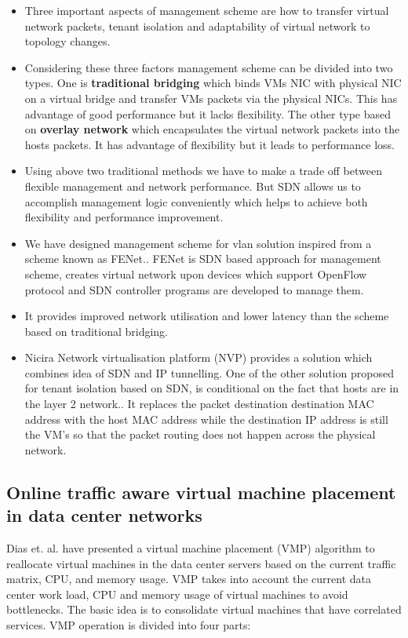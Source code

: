 \begin{itemize}
    \item Three important aspects of management scheme are how to transfer virtual network packets, tenant isolation and adaptability of virtual network to topology changes.
    \item Considering these three factors management scheme can be divided into two types. One is \textbf{traditional bridging} which binds VMs NIC with physical NIC on a virtual bridge and transfer VMs packets via the physical NICs. This has advantage of good performance but it lacks flexibility.
    The other type based on \textbf{overlay network} which encapsulates the virtual network packets into the hosts packets. It has advantage of flexibility but it leads to performance loss.
    \item Using above two traditional methods we have to make a trade off between flexible management and network performance. But SDN allows us to accomplish management logic conveniently which helps to  achieve both flexibility and performance improvement.
    \item We have designed management scheme for vlan solution inspired from a scheme known as FENet.\cite{liu2014fenet}. FENet is SDN based approach for management scheme, creates virtual network upon devices which support OpenFlow protocol and SDN controller programs are developed to manage them.
    \item It provides improved network utilisation and lower latency than the scheme based on traditional bridging.
    \item Nicira Network virtualisation platform (NVP) provides a solution which combines idea of SDN and IP tunnelling. One of the other solution proposed for tenant isolation based on SDN, is conditional on the fact that hosts are in the layer 2 network.\cite{nunes2013virtualized}. It replaces the packet destination destination MAC address with the host MAC address while the destination IP address is still the VM's so that the packet routing does not happen across the physical network.
\end{itemize}

\subsection{Online traffic aware virtual machine placement in data center networks}
Dias et. al.\cite{dias2012online} have presented a virtual machine placement (VMP) algorithm to reallocate virtual machines in the data center servers based on the current traffic matrix, CPU, and memory usage. VMP takes into account the current data center work load, CPU and memory usage of virtual machines to avoid bottlenecks. The basic idea is to consolidate virtual machines that have correlated services. VMP operation is divided into four parts:

